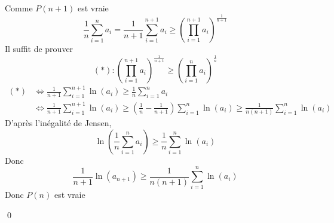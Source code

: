 \begin{itemize}
		Comme $P(n+1)$ est vraie \[
		\frac{1}{n}\sum^{n}_{i=1} a_i = \frac{1}{n+1}\sum^{n+1}_{i=1} a_i \ge  \left( \prod_{i=1}^{n+1} a_i  \right) ^{\frac{1}{n+1}}
		\] 
		Il suffit de prouver  \[
			(*): \left( \prod_{i=1}^{n+1} a_i  \right) ^{\frac{1}{n+1}} \ge  \left( \prod_{i=1}^{n} a_i  \right) ^{\frac{1}{n}}
		\] 
		\begin{align*}
			(*) &\iff \frac{1}{n+1} \sum_{i=1}^{n+1} \ln(a_i) \ge \frac{1}{n} \sum_{i=1}^{n} a_i\\
					&\iff \frac{1}{n+1}\sum_{i =1}^{n+1} \ln(a_i) \ge  \left( \frac{1}{n} - \frac{1}{n+1} \right) \sum_{i=1}^{n} \ln(a_i) \ge  \frac{1}{n(n+1)} \sum_{i=1}^{n} \ln(a_i)
		\end{align*}
		D'après l'inégalité de Jensen,\[
			\ln\left( \frac{1}{n}\sum_{i=1}^{n} a_i \right) \ge \frac{1}{n} \sum_{i=1}^{n} \ln(a_i)
		\] Donc \[
		\frac{1}{n+1} \ln(a_{n+1}) \ge \frac{1}{n(n+1)} \sum_{i=1}^{n} \ln(a_i)
		\] Donc $P(n)$ est vraie
\end{itemize}

\qed
